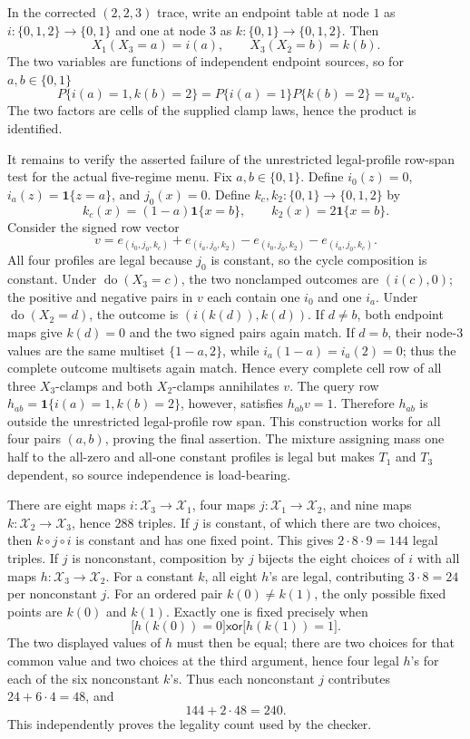 In the corrected \((2,2,3)\) trace, write an endpoint table at node \(1\) as \(i:\{0,1,2\}\to\{0,1\}\) and one at node \(3\) as \(k:\{0,1\}\to\{0,1,2\}\).  Then
\[
 X_1(X_3=a)=i(a),\qquad X_3(X_2=b)=k(b).
\]
The two variables are functions of independent endpoint sources, so for \(a,b\in\{0,1\}\)
\[
 P\{i(a)=1,k(b)=2\}=P\{i(a)=1\}P\{k(b)=2\}=u_av_b.
\]
The two factors are cells of the supplied clamp laws, hence the product is identified.

It remains to verify the asserted failure of the unrestricted legal-profile row-span test for the actual five-regime menu.  Fix \(a,b\in\{0,1\}\).  Define \(i_0(z)=0\), \(i_a(z)=\mathbf 1\{z=a\}\), and \(j_0(x)=0\).  Define \(k_c,k_2:\{0,1\}\to\{0,1,2\}\) by
\[
 k_c(x)=(1-a)\mathbf 1\{x=b\},\qquad k_2(x)=2\mathbf 1\{x=b\}.
\]
Consider the signed row vector
\[
 v=e_{(i_0,j_0,k_c)}+e_{(i_a,j_0,k_2)}-e_{(i_0,j_0,k_2)}-e_{(i_a,j_0,k_c)}.
\]
All four profiles are legal because \(j_0\) is constant, so the cycle composition is constant.  Under \(\operatorname{do}(X_3=c)\), the two nonclamped outcomes are \((i(c),0)\); the positive and negative pairs in \(v\) each contain one \(i_0\) and one \(i_a\).  Under \(\operatorname{do}(X_2=d)\), the outcome is \((i(k(d)),k(d))\).  If \(d\ne b\), both endpoint maps give \(k(d)=0\) and the two signed pairs again match.  If \(d=b\), their node-\(3\) values are the same multiset \(\{1-a,2\}\), while \(i_a(1-a)=i_a(2)=0\); thus the complete outcome multisets again match.  Hence every complete cell row of all three \(X_3\)-clamps and both \(X_2\)-clamps annihilates \(v\).  The query row \(h_{ab}=\mathbf 1\{i(a)=1,k(b)=2\}\), however, satisfies \(h_{ab}v=1\).  Therefore \(h_{ab}\) is outside the unrestricted legal-profile row span.  This construction works for all four pairs \((a,b)\), proving the final assertion.  The mixture assigning mass one half to the all-zero and all-one constant profiles is legal but makes \(T_1\) and \(T_3\) dependent, so source independence is load-bearing.

There are eight maps \(i:\mathcal X_3\to\mathcal X_1\), four maps \(j:\mathcal X_1\to\mathcal X_2\), and nine maps \(k:\mathcal X_2\to\mathcal X_3\), hence \(288\) triples.  If \(j\) is constant, of which there are two choices, then \(k\circ j\circ i\) is constant and has one fixed point.  This gives \(2\cdot8\cdot9=144\) legal triples.  If \(j\) is nonconstant, composition by \(j\) bijects the eight choices of \(i\) with all maps \(h:\mathcal X_3\to\mathcal X_2\).  For a constant \(k\), all eight \(h\)'s are legal, contributing \(3\cdot8=24\) per nonconstant \(j\).  For an ordered pair \(k(0)\ne k(1)\), the only possible fixed points are \(k(0)\) and \(k(1)\).  Exactly one is fixed precisely when
\[
 \bigl[h(k(0))=0\bigr]\mathbin{\mathsf{xor}}\bigl[h(k(1))=1\bigr].
\]
The two displayed values of \(h\) must then be equal; there are two choices for that common value and two choices at the third argument, hence four legal \(h\)'s for each of the six nonconstant \(k\)'s.  Thus each nonconstant \(j\) contributes \(24+6\cdot4=48\), and
\[
 144+2\cdot48=240.
\]
This independently proves the legality count used by the checker.

